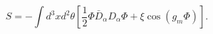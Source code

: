\begin{equation}
\label{0}
S=-\int d^3xd^2\theta\left[\frac12\Phi\bar D_\alpha D_\alpha\Phi+\xi
\cos\left(g_m\Phi\right)\right].
\end{equation}

